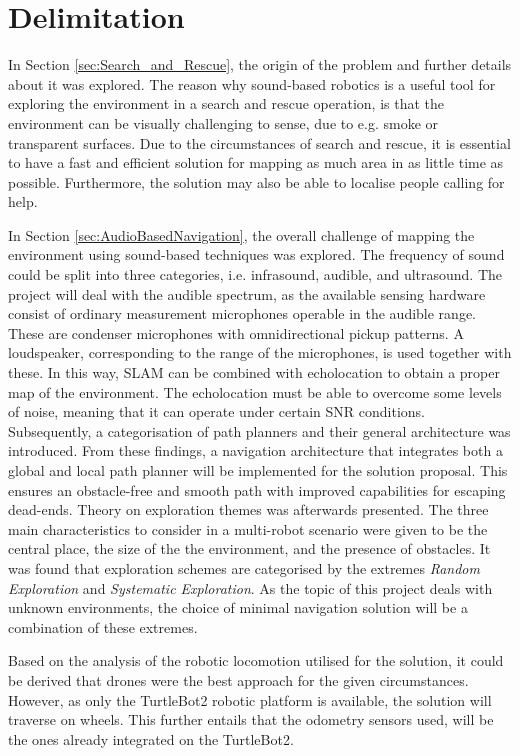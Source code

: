 \section{Delimitation}\label{sec:Delimitation}

In Section \ref{sec:Search_and_Rescue}, the origin of the problem and further details about it was explored. The reason why sound-based robotics is a useful tool for exploring the environment in a search and rescue operation, is that the environment can be visually challenging to sense, due to e.g. smoke or transparent surfaces. Due to the circumstances of search and rescue, it is essential to have a fast and efficient solution for mapping as much area in as little time as possible. Furthermore, the solution may also be able to localise people calling for help.

In Section \ref{sec:AudioBasedNavigation}, the overall challenge of mapping the environment using sound-based techniques was explored. The frequency of sound could be split into three categories, i.e. infrasound, audible, and ultrasound. The project will deal with the audible spectrum, as the available sensing hardware consist of ordinary measurement microphones operable in the audible range. These are condenser microphones with omnidirectional pickup patterns. A loudspeaker, corresponding to the range of the microphones, is used together with these. In this way, \gls{SLAM} can be combined with echolocation to obtain a proper map of the environment. The echolocation must be able to overcome some levels of noise, meaning that it can operate under certain \gls{SNR} conditions. Subsequently, a categorisation of path planners and their general architecture was introduced. From these findings, a navigation architecture that integrates both a global and local path planner will be implemented for the solution proposal. This ensures an obstacle-free and smooth path with improved capabilities for escaping dead-ends. Theory on exploration themes was afterwards presented. The three main characteristics to consider in a multi-robot scenario were given to be the central place, the size of the the environment, and the presence of obstacles. It was found that exploration schemes are categorised by the extremes \textit{Random Exploration} and \textit{Systematic Exploration}. As the topic of this project deals with unknown environments, the choice of minimal navigation solution will be a combination of these extremes. 

Based on the analysis of the robotic locomotion utilised for the solution, it could be derived that drones were the best approach for the given circumstances. However, as only the TurtleBot2 robotic platform is available, the solution will traverse on wheels. This further entails that the odometry sensors used, will be the ones already integrated on the TurtleBot2. 



